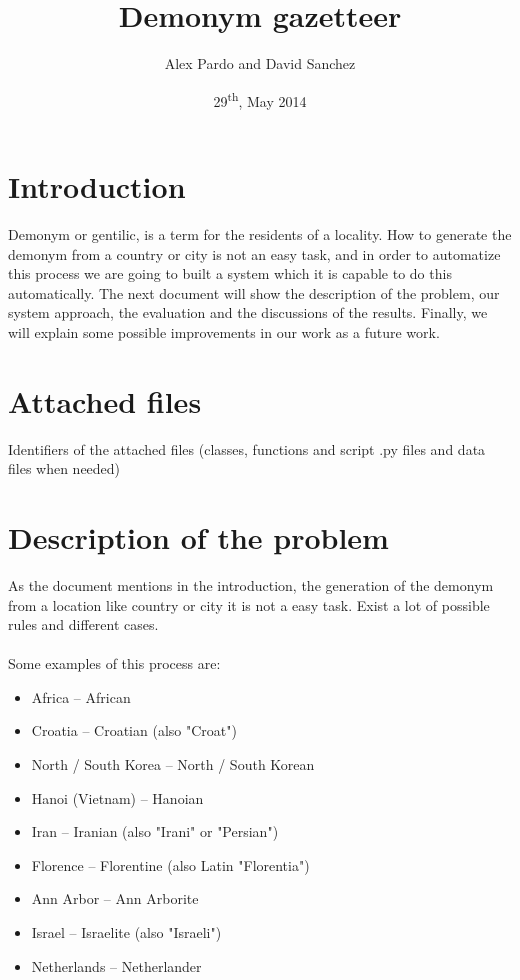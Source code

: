 \documentclass[]{report}
\title{Demonym gazetteer}
\date{29\textsuperscript{th}, May 2014}
\author{Alex Pardo and David Sanchez}
\begin{document}
\maketitle

\tableofcontents

\newpage

\section{Introduction}

Demonym or gentilic, is a term for the residents of a locality. How to generate the demonym from a country or city is not an easy task, and in order to automatize this process we are going to built a system which it is capable to do this automatically. The next document will show the description of the problem, our system approach, the evaluation and the discussions of the results. Finally, we will explain some possible improvements in our work as a future work.

\section{Attached files}

Identifiers of the attached files (classes, functions and script .py files and
data files when needed)

\section{Description of the problem}

As the document mentions in the introduction, the generation of the demonym from a location like country or city it is not a easy task. Exist a lot of possible rules and different cases. 
\\\\Some examples of this process are:
\begin{itemize}
\item Africa -- African
\item Croatia -- Croatian (also "Croat")
\item North / South Korea -- North / South Korean
\item Hanoi (Vietnam) -- Hanoian
\item Iran -- Iranian (also "Irani" or "Persian")
\item Florence -- Florentine (also Latin "Florentia")
\item Ann Arbor -- Ann Arborite
\item Israel -- Israelite (also "Israeli")
\item Netherlands -- Netherlander
\end{itemize}
\end{document}

